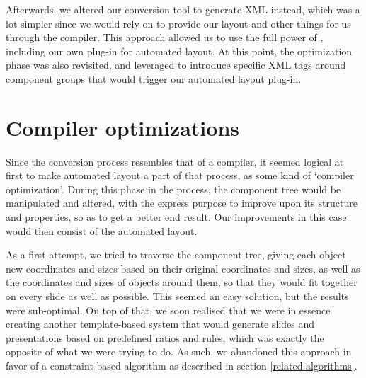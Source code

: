    Afterwards, we altered our conversion tool to generate \mxp XML instead,
   which was a lot simpler since we would rely on \mxp to provide our layout
   and other things for us through the \mxp compiler. This approach allowed us
   to use the full power of \mxp, including our own plug-in for automated
   layout. At this point, the optimization phase was also revisited, and
   leveraged to introduce specific XML tags around component groups that would
   trigger our automated layout plug-in.

  \section{Compiler optimizations}
   \label{compiler-optimizations}

   Since the conversion process resembles that of a compiler, it seemed logical
   at first to make automated layout a part of that process, as some kind of
   `compiler optimization'. During this phase in the process, the component
   tree would be manipulated and altered, with the express purpose to improve
   upon its structure and properties, so as to get a better end result. Our
   improvements in this case would then consist of the automated layout.

   As a first attempt, we tried to traverse the component tree, giving each
   object new coordinates and sizes based on their original coordinates and
   sizes, as well as the coordinates and sizes of objects around them, so that
   they would fit together on every slide as well as possible. This seemed an
   easy solution, but the results were sub-optimal. On top of that, we soon
   realised that we were in essence creating another template-based system that
   would generate slides and presentations based on predefined ratios and
   rules, which was exactly the opposite of what we were trying to do. As such,
   we abandoned this approach in favor of a constraint-based algorithm as
   described in section \ref{related-algorithms}.

